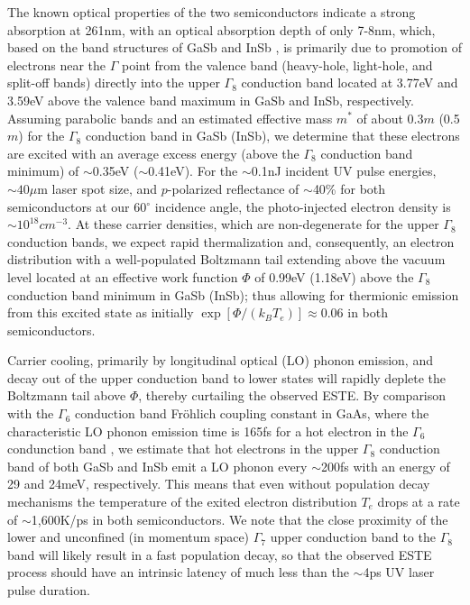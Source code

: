 The known optical properties of the two semiconductors \cite{aspnes_dielectric_1983} indicate a strong absorption at 261nm, with an optical absorption depth of only 7-8nm, which, based on the band structures of GaSb \cite{chelikowsky_nonlocal_1976} and InSb \cite{chelikowsky_erratum_1984}, is primarily due to promotion of electrons near the $\Gamma$ point from the valence band (heavy-hole, light-hole, and split-off bands) directly into the upper $\Gamma_8$ conduction band located at 3.77eV and 3.59eV above the valence band maximum in GaSb and InSb, respectively.
Assuming parabolic bands and an estimated effective mass $m^*$ of about 0.3$m$ (0.5$m$) for the $\Gamma_8$ conduction band in GaSb (InSb), we determine that these electrons are excited with an average excess energy (above the $\Gamma_8$ conduction band minimum) of $\sim$0.35eV ($\sim$0.41eV).
For the $\sim$0.1nJ incident UV pulse energies, $\sim40\mu$m laser spot size, and $p$-polarized reflectance of $\sim$40\% for both semiconductors at our 60$^{\circ}$ incidence angle, the photo-injected electron density is $\sim10^{18}cm^{-3}$.
At these carrier densities, which are non-degenerate for the upper $\Gamma_8$ conduction bands, we expect rapid thermalization \cite{portella_k-space_1992} and, consequently, an electron distribution with a well-populated Boltzmann tail extending above the vacuum level located at an effective work function $\Phi$ of 0.99eV (1.18eV) above the $\Gamma_8$ conduction band minimum in GaSb (InSb); thus allowing for thermionic emission from this excited state as initially $\exp[\Phi/(k_B T_e)] \approx 0.06$ in both semiconductors.  

Carrier cooling, primarily by longitudinal optical (LO) phonon emission, and decay out of the upper conduction band to lower states will rapidly deplete the Boltzmann tail above $\Phi$, thereby curtailing the observed ESTE.
By comparison with the $\Gamma_6$ conduction band Fr\"ohlich coupling constant in GaAs, where the characteristic LO phonon emission time is 165fs for a hot electron in the $\Gamma_6$ condunction band \cite{kash_subpicosecond_1985}, we estimate that hot electrons in the upper $\Gamma_8$ conduction band of both GaSb and InSb emit a LO phonon every $\sim$200fs with an energy of 29 and 24meV, respectively.
This means that even without population decay mechanisms the temperature of the exited electron distribution $T_e$ drops at a rate of $\sim$1,600K/ps in both semiconductors.
We note that the close proximity of the lower and unconfined (in momentum space) $\Gamma_7$ upper conduction band to the $\Gamma_8$ band will likely result in a fast population decay, so that the observed ESTE process should have an intrinsic latency of much less than the $\sim$4ps UV laser pulse duration.

